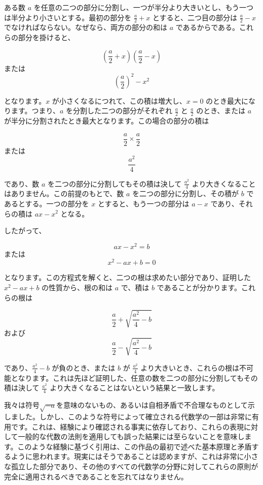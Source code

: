 \documentclass[a4paper,11pt,openany]{ltjsbook}
\begin{document}
ある数 \( a \) を任意の二つの部分に分割し、一つが半分より大きいとし、もう一つは半分より小さいとする。最初の部分を \(\frac{a}{2} + x\) とすると、二つ目の部分は \(\frac{a}{2} - x\) でなければならない。なぜなら、両方の部分の和は \( a \) であるからである。これらの部分を掛けると、

\[
\left( \frac{a}{2} + x \right) \left( \frac{a}{2} - x \right)
\]
または
\[
\left( \frac{a}{2} \right)^2 - x^2
\]

となります。\( x \) が小さくなるにつれて、この積は増大し、\( x = 0 \) のとき最大になります。つまり、\( a \) を分割した二つの部分がそれぞれ \(\frac{a}{2}\) と \(\frac{a}{2}\) のとき、または \( a \) が半分に分割されたとき最大となります。この場合の部分の積は

\[
\frac{a}{2} \times \frac{a}{2}
\]
または
\[
\frac{a^2}{4}
\]

であり、数 \( a \) を二つの部分に分割してもその積は決して \(\frac{a^2}{4}\) より大きくなることはありません。この前提のもとで、数 \( a \) を二つの部分に分割し、その積が \( b \) であるとする。一つの部分を \( x \) とすると、もう一つの部分は \( a - x \) であり、それらの積は \( ax - x^2 \) となる。

したがって、

\[
ax - x^2 = b
\]
または
\[
x^2 - ax + b = 0
\]

となります。この方程式を解くと、二つの根は求めたい部分であり、証明した \( x^2 - ax + b \) の性質から、根の和は \( a \) で、積は \( b \) であることが分かります。これらの根は

\[
\frac{a}{2} + \sqrt{\frac{a^2}{4} - b}
\]
および
\[
\frac{a}{2} - \sqrt{\frac{a^2}{4} - b}
\]

であり、\(\frac{a^2}{4} - b\) が負のとき、または \( b \) が \(\frac{a^2}{4}\) より大きいとき、これらの根は不可能となります。これは先ほど証明した、任意の数を二つの部分に分割してもその積は決して \(\frac{a^2}{4}\) より大きくなることはないという結果と一致します。

我々は符号$\sqrt{-a}$を意味のないもの、あるいは自相矛盾で不合理なものとして示しました。しかし、このような符号によって確立される代数学の一部は非常に有用です。これは、経験により確認される事実に依存しており、これらの表現に対して一般的な代数の法則を適用しても誤った結果には至らないことを意味します。このような経験に基づく引用は、この作品の最初で述べた基本原理と矛盾するように思われます。現実にはそうであることは認めますが、これは非常に小さな孤立した部分であり、その他のすべての代数学の分野に対してこれらの原則が完全に適用されるべきであることを忘れてはなりません。
\end{document}
